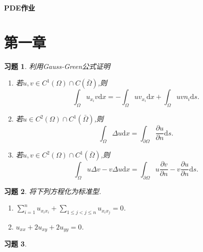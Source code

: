 \documentclass[a4paper,oneside,12pt]{ctexart}
\theoremstyle{plain}
\newtheorem{exercise}{习题}[section]
\theoremstyle{nonumberplain}
\theoremstyle{nonumberplain}
\newcommand{\dif}{\mathrm{d}}
\newcommand{\ptl}{\partial}
\begin{document}
    \begin{center}
        \LARGE\bfseries
        PDE作业
    \end{center}

    \section{第一章}
    
    \begin{exercise}\label{ex:1.1}
        利用Gauss-Green公式证明
        \begin{enumerate}
            \item 若$u,v\in C^1(\Omega)\cap C(\bar{\Omega})$,则\begin{equation*}
                \int_\Omega u_{x_i}v\dif x=-\int_\Omega uv_{x_i}\dif x+\int_\Omega uvn_i\dif s.
            \end{equation*}
            \item 若$u\in C^2(\Omega)\cap C^1(\bar{\Omega})$,则\begin{equation*}
                \int_\Omega \Delta u\dif x=\int_{\ptl\Omega}\frac{\ptl u}{\ptl n}\dif s.
            \end{equation*}
            \item 若$u,v\in C^2(\Omega)\cap C^1(\bar{\Omega})$,则\begin{equation*}
                \int_\Omega u\Delta v-v\Delta u\dif x=\int_{\ptl \Omega}u\frac{\ptl v}{\ptl n}-v\frac{\ptl u}{\ptl n}\dif s.
            \end{equation*}
        \end{enumerate}
    \end{exercise}

    \begin{exercise}
        \label{ex:1.2}
        将下列方程化为标准型.
        \begin{enumerate}
            \item $\sum_{i=1}^nu_{x_ix_i}+\sum_{1\leqslant j<j\leqslant n}u_{x_ix_j}=0$.
            \item $u_{xx}+2u_{xy}+2u_{yy}=0$.
        \end{enumerate}
    \end{exercise}

    \begin{exercise}
        \label{ex:1.3}
        
    \end{exercise}
\end{document}

